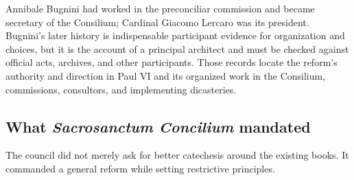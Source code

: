 Annibale Bugnini had worked in the preconciliar commission and became secretary of the Consilium; Cardinal Giacomo Lercaro was its president. Bugnini's later history is indispensable participant evidence for organization and choices, but it is the account of a principal architect and must be checked against official acts, archives, and other participants. Those records locate the reform's authority and direction in Paul VI and its organized work in the Consilium, commissions, consultors, and implementing dicasteries.

\subsection{What \emph{Sacrosanctum Concilium} mandated}

The council did not merely ask for better catechesis around the existing books. It commanded a general reform while setting restrictive principles.

